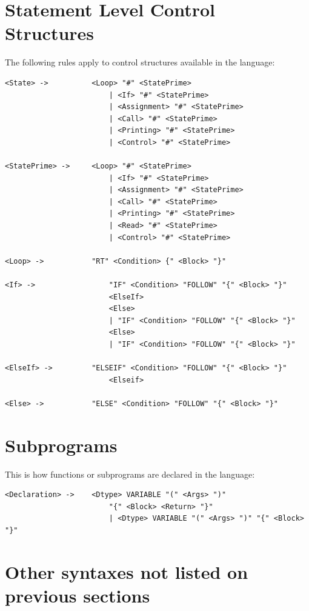 \documentclass[11pt,a4paper]{report}
\begin{document}
\section{Statement Level Control Structures}

The following rules apply to control structures available in the language:
\begin{lstlisting}
<State> ->			<Loop> "#" <StatePrime>
        				| <If> "#" <StatePrime>
        				| <Assignment> "#" <StatePrime>
        				| <Call> "#" <StatePrime>
        				| <Printing> "#" <StatePrime>
        				| <Control> "#" <StatePrime>
        			
<StatePrime> -> 	<Loop> "#" <StatePrime>
        				| <If> "#" <StatePrime>
        				| <Assignment> "#" <StatePrime>
        				| <Call> "#" <StatePrime>
        				| <Printing> "#" <StatePrime>
        				| <Read> "#" <StatePrime>
        				| <Control> "#" <StatePrime>
        			
<Loop> -> 			"RT" <Condition> {" <Block> "}"

<If> -> 				"IF" <Condition> "FOLLOW" "{" <Block> "}"
						<ElseIf>
						<Else>
        				| "IF" <Condition> "FOLLOW" "{" <Block> "}"
        				<Else>
        				| "IF" <Condition> "FOLLOW" "{" <Block> "}"
        			
<ElseIf> ->			"ELSEIF" <Condition> "FOLLOW" "{" <Block> "}"
						<Elseif>

<Else> -> 			"ELSE" <Condition> "FOLLOW" "{" <Block> "}"
\end{lstlisting}

\section{Subprograms}

This is how functions or subprograms are declared in the language:
\begin{lstlisting}
<Declaration> ->	<Dtype> VARIABLE "(" <Args> ")"
						"{" <Block> <Return> "}"
						| <Dtype> VARIABLE "(" <Args> ")" "{" <Block> "}"
\end{lstlisting}

\section{Other syntaxes not listed on previous sections}
\end{document}
